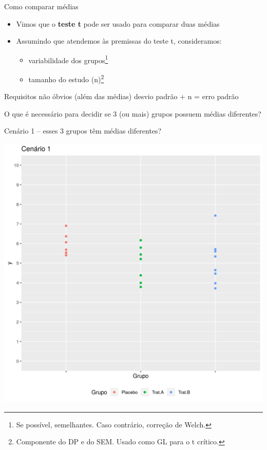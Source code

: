 \documentclass{beamer}
\begin{document}
\begin{frame}[label=requisito]{Como comparar médias}
  \begin{itemize}
    \footnotesize
  \item Vimos que o {\bf teste t} pode ser usado para comparar duas médias
    \bigskip
  \item Assumindo que atendemos às premissas do teste t, consideramos:
    \begin{itemize}
      \footnotesize
    \item variabilidade dos grupos\footnote{\scriptsize Se possível, semelhantes. Caso contrário, correção de Welch.}
    \item tamanho do estudo (n)\footnote{\scriptsize Componente do DP e do SEM. Usado como GL para o t crítico.}
    \end{itemize}
  \end{itemize}
  \bigskip
  \begin{block}{Requisitos não óbvios (além das médias)}
    desvio padrão + n = erro padrão
  \end{block}
\end{frame}

\begin{frame}
  \begin{block}{}
    O que é necessário para decidir se 3 (ou mais) grupos possuem médias diferentes?
  \end{block}
\end{frame}

\begin{frame}[label=cenario1]{\small Cenário 1 -- esses 3 grupos têm médias diferentes?}
  \begin{center}
    \includegraphics[height=.9\textheight]{Cap13-30/cenario1}
  \end{center}
\end{frame}
\end{document}
